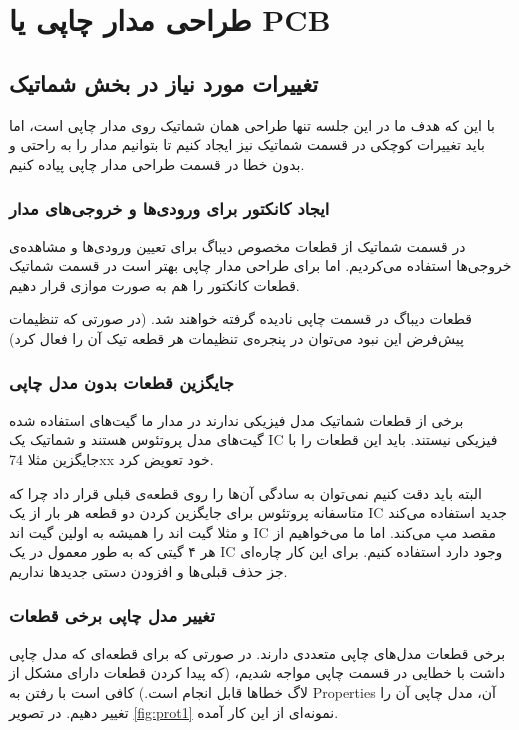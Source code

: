 \chapter{
طراحی
مدار چاپی
یا
PCB
}

\section{
تغییرات مورد نیاز در بخش شماتیک
}
با این که هدف ما در این جلسه تنها طراحی همان شماتیک روی مدار چاپی است، اما باید تغییرات کوچکی در قسمت شماتیک نیز ایجاد کنیم تا بتوانیم مدار را به راحتی و بدون خطا در قسمت طراحی مدار چاپی پیاده کنیم.

\subsection{
ایجاد کانکتور برای ورودی‌ها و خروجی‌های مدار
}
در قسمت شماتیک از قطعات مخصوص دیباگ برای تعیین ورودی‌ها و مشاهده‌ی خروجی‌ها استفاده می‌کردیم.
اما برای طراحی مدار چاپی بهتر است در قسمت شماتیک قطعات کانکتور را هم به صورت موازی قرار دهیم.

قطعات دیباگ در قسمت چاپی نادیده گرفته خواهند شد. (در صورتی که تنظیمات پیش‌فرض این نبود می‌توان در پنجره‌ی تنظیمات هر قطعه تیک
آن را فعال کرد)

\subsection{
جایگزین قطعات بدون مدل چاپی
}
برخی از قطعات شماتیک مدل فیزیکی ندارند
در مدار ما گیت‌های استفاده شده گیت‌های مدل پروتئوس هستند و شماتیک یک
IC
فیزیکی نیستند.
باید این قطعات را با جایگزین
مثلا
74xx
خود تعویض کرد.

البته باید دقت کنیم نمی‌توان به سادگی آن‌ها را روی قطعه‌ی قبلی قرار داد چرا که متاسفانه پروتئوس برای جایگزین کردن دو قطعه هر بار از یک
IC
جدید استفاده می‌کند و مثلا گیت اند را همیشه به اولین گیت اند
IC
مقصد مپ می‌کند.
اما ما می‌خواهیم از هر ۴ گیتی که به طور معمول در یک
IC
وجود دارد استفاده کنیم.
برای این کار چاره‌ای جز حذف قبلی‌ها و افزودن دستی جدیدها نداریم.

\subsection{
تغییر مدل چاپی برخی قطعات
}
برخی قطعات مدل‌های چاپی متعددی دارند. در صورتی که برای قطعه‌ای که مدل چاپی داشت با خطایی در قسمت چاپی مواجه شدیم،
(که پیدا کردن قطعات دارای مشکل از لاگ خطاها قابل انجام است.)
کافی است با رفتن به
Properties
آن، مدل چاپی آن را تغییر دهیم.
در تصویر
\eqref{fig:prot1}
نمونه‌ای از این کار آمده.

